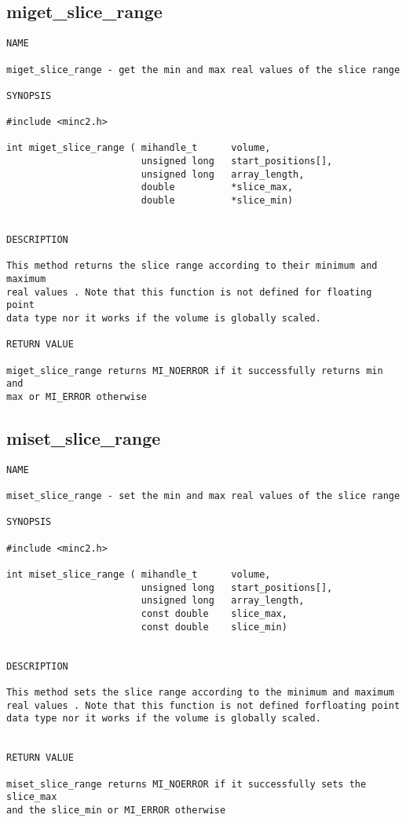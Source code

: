 \documentclass{article}
\begin{document}
\subsection{miget\_slice\_range}
\begin{verbatim}
NAME 

miget_slice_range - get the min and max real values of the slice range

SYNOPSIS

#include <minc2.h>

int miget_slice_range ( mihandle_t      volume,
                        unsigned long   start_positions[],
                        unsigned long   array_length,
                        double          *slice_max,
                        double          *slice_min)
                       
                                
DESCRIPTION

This method returns the slice range according to their minimum and maximum
real values . Note that this function is not defined for floating point 
data type nor it works if the volume is globally scaled.

RETURN VALUE

miget_slice_range returns MI_NOERROR if it successfully returns min and
max or MI_ERROR otherwise
\end{verbatim}

\subsection{miset\_slice\_range}
\begin{verbatim}
NAME 

miset_slice_range - set the min and max real values of the slice range

SYNOPSIS

#include <minc2.h>

int miset_slice_range ( mihandle_t      volume,
                        unsigned long   start_positions[],
                        unsigned long   array_length,
                        const double    slice_max,
                        const double    slice_min)
                       
                                
DESCRIPTION

This method sets the slice range according to the minimum and maximum
real values . Note that this function is not defined forfloating point 
data type nor it works if the volume is globally scaled.


RETURN VALUE

miset_slice_range returns MI_NOERROR if it successfully sets the slice_max
and the slice_min or MI_ERROR otherwise
\end{verbatim}
\end{document}
